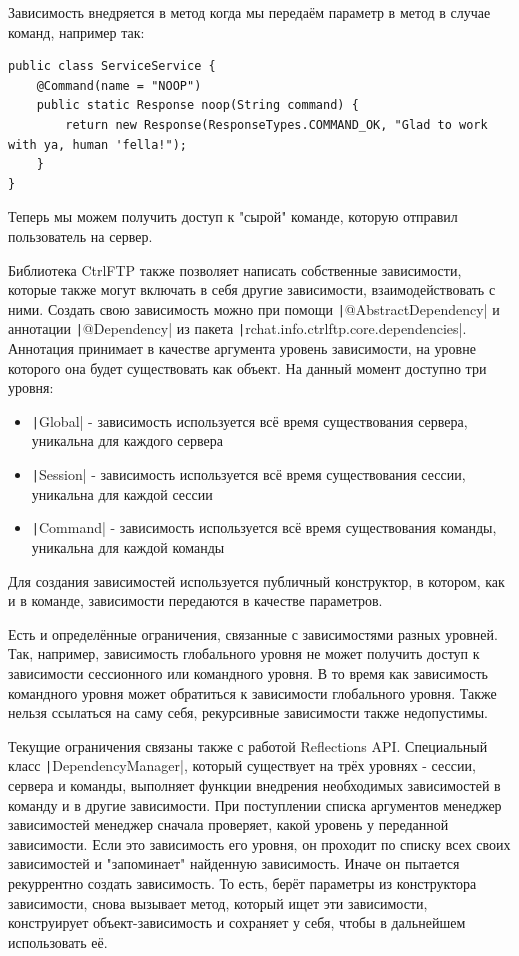 \documentclass[a4paper,14pt]{extarticle}
\begin{document}
Зависимость внедряется в метод когда мы передаём параметр в метод в случае команд, например так:

\begin{verbatim}
public class ServiceService {
    @Command(name = "NOOP")
    public static Response noop(String command) {
        return new Response(ResponseTypes.COMMAND_OK, "Glad to work with ya, human 'fella!");
    }
}
\end{verbatim}

Теперь мы можем получить доступ к "сырой" команде, которую отправил пользователь на сервер. 

Библиотека CtrlFTP также позволяет написать собственные зависимости, которые также могут включать 
в себя другие зависимости, взаимодействовать с ними. Создать свою зависимость можно при помощи
\texttt|@AbstractDependency| и аннотации \texttt|@Dependency|
из пакета \texttt|rchat.info.ctrlftp.core.dependencies|. 
Аннотация принимает в качестве аргумента уровень зависимости, на уровне которого она будет 
существовать как объект. На данный момент доступно три уровня:
\begin{itemize}
  \item \texttt|Global| - зависимость используется всё время существования сервера, уникальна для каждого сервера
  \item \texttt|Session| - зависимость используется всё время существования сессии, уникальна для каждой сессии
  \item \texttt|Command| - зависимость используется всё время существования команды, уникальна для каждой команды
\end{itemize}

Для создания зависимостей используется публичный конструктор, в котором, как и в команде, зависимости 
передаются в качестве параметров. 

Есть и определённые ограничения, связанные с зависимостями разных уровней. Так, например, зависимость 
глобального уровня не может получить доступ к зависимости сессионного или командного уровня. В то время как
зависимость командного уровня может обратиться к зависимости глобального уровня. Также нельзя ссылаться 
на саму себя, рекурсивные зависимости также недопустимы. 

Текущие ограничения связаны также с работой Reflections API. Специальный класс \texttt|DependencyManager|, который
существует на трёх уровнях - сессии, сервера и команды, выполняет функции внедрения необходимых зависимостей в команду и 
в другие зависимости. При поступлении списка аргументов менеджер зависимостей менеджер сначала проверяет, какой уровень у 
переданной зависимости. Если это зависимость его уровня, он проходит по списку всех своих зависимостей и "запоминает" найденную
зависимость. Иначе он пытается рекуррентно создать зависимость. То есть, берёт параметры из конструктора зависимости, 
снова вызывает метод, который ищет эти зависимости, конструирует объект-зависимость и сохраняет у себя, чтобы в дальнейшем
использовать её. 
\end{document}
